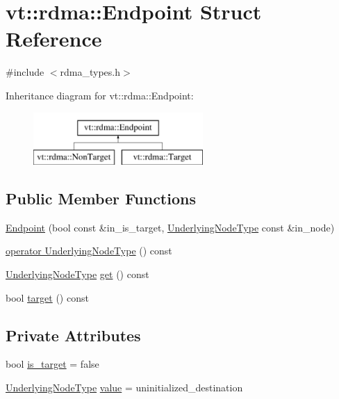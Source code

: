 \hypertarget{structvt_1_1rdma_1_1_endpoint}{}\section{vt\+:\+:rdma\+:\+:Endpoint Struct Reference}
\label{structvt_1_1rdma_1_1_endpoint}


{\ttfamily \#include $<$rdma\+\_\+types.\+h$>$}

Inheritance diagram for vt\+:\+:rdma\+:\+:Endpoint\+:\begin{figure}[H]
\begin{center}
\leavevmode
\includegraphics[height=2.000000cm]{structvt_1_1rdma_1_1_endpoint}
\end{center}
\end{figure}
\subsection*{Public Member Functions}
\begin{DoxyCompactItemize}
\item 
\hyperlink{structvt_1_1rdma_1_1_endpoint_a86219af1b6b52cf394085afb2b2d0f12}{Endpoint} (bool const \&in\+\_\+is\+\_\+target, \hyperlink{namespacevt_1_1rdma_a20d01bc82b95453c162d4b9857a4a78a}{Underlying\+Node\+Type} const \&in\+\_\+node)
\item 
\hyperlink{structvt_1_1rdma_1_1_endpoint_a5ef52e7373b28cecdd240f91eb5b5cc4}{operator Underlying\+Node\+Type} () const
\item 
\hyperlink{namespacevt_1_1rdma_a20d01bc82b95453c162d4b9857a4a78a}{Underlying\+Node\+Type} \hyperlink{structvt_1_1rdma_1_1_endpoint_a1eb7530a3e8dc1c223a3b806922ad734}{get} () const
\item 
bool \hyperlink{structvt_1_1rdma_1_1_endpoint_a6ef942569868488e455a581a8c81a250}{target} () const
\end{DoxyCompactItemize}
\subsection*{Private Attributes}
\begin{DoxyCompactItemize}
\item 
bool \hyperlink{structvt_1_1rdma_1_1_endpoint_a756be3e169f0d65f7cb73b04b3bcfca0}{is\+\_\+target} = false
\item 
\hyperlink{namespacevt_1_1rdma_a20d01bc82b95453c162d4b9857a4a78a}{Underlying\+Node\+Type} \hyperlink{structvt_1_1rdma_1_1_endpoint_a08bf5fd51422c9fd67d76afffa9a7cb2}{value} = uninitialized\+\_\+destination
\end{DoxyCompactItemize}


